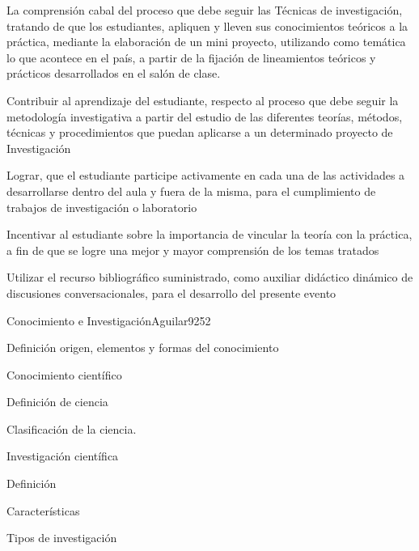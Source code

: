 \begin{syllabus}


\begin{justification}
La comprensión cabal del proceso que debe seguir las Técnicas de
investigación,  tratando de que los estudiantes, apliquen y lleven 
sus conocimientos teóricos a la  práctica, mediante la elaboración 
de un mini proyecto,  utilizando como temática  lo que acontece en 
el país,  a partir de la fijación de lineamientos  teóricos y 
prácticos desarrollados en el salón de clase.
\end{justification}

\begin{goals}
\item Contribuir al aprendizaje del estudiante, respecto al proceso que debe seguir la metodología investigativa a partir del estudio de las diferentes teorías, métodos, técnicas y procedimientos que puedan aplicarse a un determinado proyecto de Investigación 
\item Lograr, que el estudiante participe activamente  en cada una de las actividades a desarrollarse dentro del aula  y fuera de la misma, para el cumplimiento de trabajos de investigación o laboratorio
\item Incentivar al estudiante sobre la  importancia de vincular la teoría con la práctica, a fin de que se logre una mejor y mayor comprensión de los temas tratados
\item Utilizar el recurso bibliográfico suministrado, como auxiliar didáctico dinámico de discusiones conversacionales,  para el desarrollo del presente evento
\end{goals}

\begin{outcomes}
\end{outcomes}

\begin{unit}{Conocimiento e Investigación}{Aguilar92}{5}{2}
   \begin{topics}
      \item Definición origen, elementos y formas del conocimiento
	\item Conocimiento científico
	\item Definición de ciencia
	\item Clasificación de la ciencia.
	\item Investigación científica
	\item Definición
	\item Características
	\item Tipos de investigación
   \end{topics}


\end{unit}
\end{syllabus}
